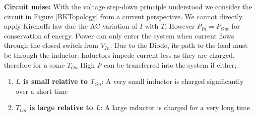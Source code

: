\documentclass[letterpaper,twocolumn,10pt]{article}
\begin{document}
\textbf{Circuit noise: }With the voltage step-down principle understood we consider the circuit in Figure \ref{BKTopology} from a current perspective. We cannot directly apply Kirchoffs law due the AC variation of $I$ with $T$. However $P_{In} = P_{Out}$ for conservation of energy. Power can only enter the system when current flows through the closed switch from $V_{In}$. Due to the Diode, its path to the load must be through the inductor. Inductors impede current less as they are charged, therefore for a some $T_{On}$ High $P$ can be transferred into the system if either;\\
\begin{enumerate}
\item{\textbf{$L$ is small relative to $T_{On}$}: A very small inductor is charged significantly over a short time}
\item{\textbf{$T_{On}$ is large relative to $L$}: A large inductor is charged for a very long time}
\end{enumerate}
\end{document}
